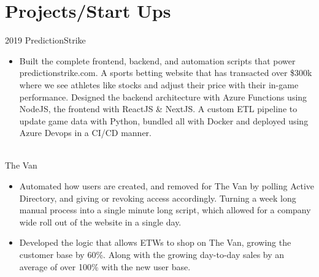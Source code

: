 \documentclass[letterpaper]{twentysecondcv} %
\begin{document}
    \section{Projects/Start Ups}
    \begin{twenty} 
    \twentyitem
    	{2019}
		{}
        {PredictionStrike}
        {}
        {}
        {
        \begin{itemize}
            \item Built the complete frontend, backend, and automation scripts that power predictionstrike.com. A sports betting website that has transacted over \$300k where we see athletes like stocks and adjust their price with their in-game performance. Designed the backend architecture with Azure Functions using NodeJS, the frontend with ReactJS \& NextJS. A custom ETL pipeline to update game data with Python, bundled all with Docker and deployed using Azure Devops in a CI/CD manner. 
            \vspace{1mm}
        \end{itemize}
        }
    \\
     \twentyitem
    	{}
		{}
        {The Van}
        {}
        {}
        {
        \begin{itemize}
            \item Automated how users are created, and removed for The Van by polling Active Directory, and giving or revoking access accordingly. Turning a week long manual process into a single minute long script, which allowed for a company wide roll out of the website in a single day.  
            \vspace{1mm}
            
            \item Developed the logic that allows ETWs to shop on The Van, growing the customer base by 60\%. Along with the growing day-to-day sales by an average of over 100\% with the new user base. 
            
            \vspace{1mm}
            

\end{itemize}}
\end{twenty}
\end{document}
